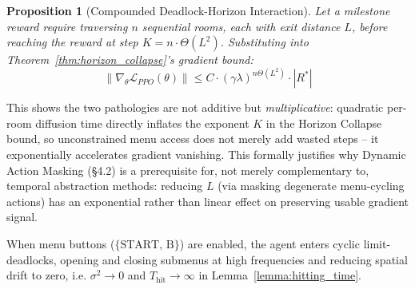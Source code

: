 \documentclass[journal,10pt,twocolumn]{IEEEtran}
\newtheorem{proposition}{Proposition}
\begin{document}
\begin{proposition}[Compounded Deadlock-Horizon Interaction]
\label{prop:compound}
Let a milestone reward require traversing $n$ sequential rooms, each with exit distance $L$, before reaching the reward at step $K = n \cdot \Theta(L^2)$. Substituting into Theorem~\ref{thm:horizon_collapse}'s gradient bound:
\begin{equation}
\|\nabla_\theta \mathcal{L}_{PPO}(\theta)\| \le C \cdot (\gamma\lambda)^{n \Theta(L^2)} \cdot |R^*|
\end{equation}
\end{proposition}
This shows the two pathologies are not additive but \emph{multiplicative}: quadratic per-room diffusion time directly inflates the exponent $K$ in the Horizon Collapse bound, so unconstrained menu access does not merely add wasted steps -- it exponentially accelerates gradient vanishing. This formally justifies why Dynamic Action Masking (\S4.2) is a prerequisite for, not merely complementary to, temporal abstraction methods: reducing $L$ (via masking degenerate menu-cycling actions) has an exponential rather than linear effect on preserving usable gradient signal.

When menu buttons ($\{\text{START, B}\}$) are enabled, the agent enters cyclic limit-deadlocks, opening and closing submenus at high frequencies and reducing spatial drift to zero, i.e. $\sigma^2 \to 0$ and $T_{\text{hit}} \to \infty$ in Lemma~\ref{lemma:hitting_time}.

\begin{table}[h]
\centering
\caption{The Four Classical JRPG Algorithmic Pathologies}
\label{tab:pathologies}
\end{table}
\end{document}
